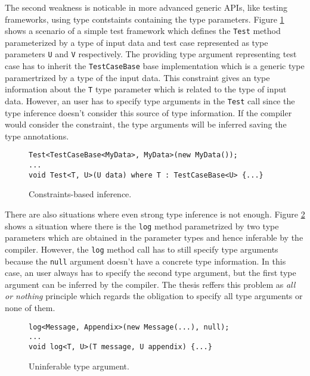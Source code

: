 \par
{}
The second weakness is noticable in more advanced generic APIs, like testing frameworks, using type contstaints containing the type parameters.
Figure \ref{img28:usecase2} shows a scenario of a simple test framework which defines the \texttt{Test} method parameterized by a type of input data and test case represented as type parameters \texttt{U} and \texttt{V} respectively.
The providing type argument representing test case has to inherit the \texttt{TestCaseBase} base implementation which is a generic type paramertrized by a type of the input data.
This constraint gives an type information about the \texttt{T} type parameter which is related to the type of input data.
However, an user has to specify type arguments in the \texttt{Test} call since the type inference doesn't consider this source of type information.
If the compiler would consider the constraint, the type arguments will be inferred saving the type annotations.
\begin{figure}[h]
\begin{lstlisting}[style=csharp]
Test<TestCaseBase<MyData>, MyData>(new MyData());
...
void Test<T, U>(U data) where T : TestCaseBase<U> {...}
\end{lstlisting}
\caption{Constraints-based inference.}
\label{img28:usecase2}
\end{figure}
\par
{}
There are also situations where even strong type inference is not enough.
Figure \ref{img29:usecase3} shows a situation where there is the \texttt{log} method parametrized by two type parameters which are obtained in the parameter types and hence inferable by the compiler.
However, the \texttt{log} method call has to still specify type arguments because the \texttt{null} argument doesn't have a concrete type information.
In this case, an user always has to specify the second type argument, but the first type argument can be inferred by the compiler.
The thesis reffers this problem as \textit{all or nothing} principle which regards the obligation to specify all type arguments or none of them.
\begin{figure}[h]
\begin{lstlisting}[style=csharp]
log<Message, Appendix>(new Message(...), null);
...
void log<T, U>(T message, U appendix) {...}
\end{lstlisting}
\caption{Uninferable type argument.}
\label{img29:usecase3}
\end{figure}

